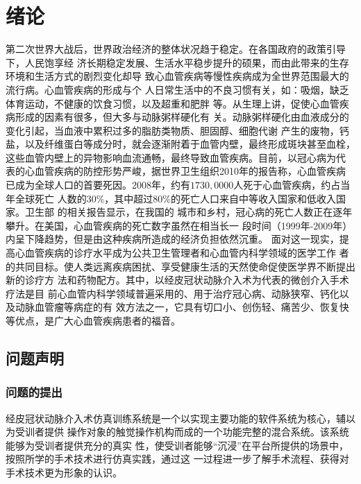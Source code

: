 \chapter{绪\;\;\;论}
\label{chap1}

第二次世界大战后，世界政治经济的整体状况趋于稳定。在各国政府的政策引导下，人民饱享经
济长期稳定发展、生活水平稳步提升的硕果，而由此带来的生存环境和生活方式的剧烈变化却导
致心血管疾病等慢性疾病成为全世界范围最大的流行病\cite{Hu2009}。心血管疾病的形成与个
人日常生活中的不良习惯有关，如：吸烟，缺乏体育运动，不健康的饮食习惯，以及超重和肥胖
等\cite{Go2013}。从生理上讲，促使心血管疾病形成的因素有很多，但大多与动脉粥样硬化有
关。动脉粥样硬化由血液成分的变化引起，当血液中累积过多的脂肪类物质、胆固醇、细胞代谢
产生的废物，钙盐，以及纤维蛋白等成分时，就会逐渐附着于血管内壁，最终形成斑块甚至血栓，
这些血管内壁上的异物影响血流通畅，最终导致血管疾病\cite{cvdaha}。目前，以冠心病为代
表的心血管疾病的防控形势严峻，据世界卫生组织2010年的报告\cite{mho2011}称，心血管疾病
已成为全球人口的首要死因。2008年，约有$1730,0000$人死于心血管疾病，约占当年全球死亡
人数的30\%，其中超过80\%的死亡人口来自中等收入国家和低收入国家\cite{mho2011}。卫生部
的相关报告\cite{moh2010annual}\cite{moh2007annual}\cite{moh2004annual}显示，在我国的
城市和乡村，冠心病的死亡人数正在逐年攀升。在美国，心血管疾病的死亡数字虽然在相当长一
段时间（1999年-2009年）内呈下降趋势，但是由这种疾病所造成的经济负担依然沉重\cite{Go2013}。
面对这一现实，提高心血管疾病的诊疗水平成为公共卫生管理者和心血管内科学领域的医学工作
者的共同目标。使人类远离疾病困扰、享受健康生活的天然使命促使医学界不断提出新的诊疗方
法和药物配方。其中，以经皮冠状动脉介入术\cite{Baim2005}为代表的微创介入手术疗法是目
前心血管内科学领域普遍采用的、用于治疗冠心病、动脉狭窄、钙化以及动脉血管瘤等病症的有
效方法之一，它具有切口小、创伤轻、痛苦少、恢复快等优点，是广大心血管疾病患者的福音。

\section{问题声明}
\label{sec1-1}

\subsection{问题的提出}
\label{subsec1-1-1}

经皮冠状动脉介入术仿真训练系统是一个以实现主要功能的软件系统为核心，辅以为受训者提供
操作对象的触觉操作机构而成的一个功能完整的混合系统。该系统能够为受训者提供充分的真实
性，使受训者能够“沉浸”在平台所提供的场景中，按照所学的手术技术进行仿真实践，通过这
一过程进一步了解手术流程、获得对手术技术更为形象的认识。

